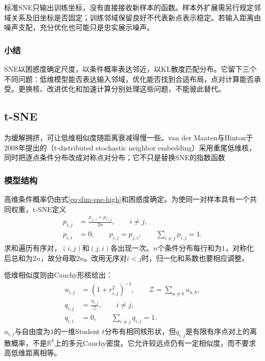 标准SNE只输出训练坐标，没有直接接收新样本的函数。样本外扩展需另行规定邻域关系及旧坐标是否固定；训练邻域保留良好不代表新点表示稳定。若输入距离由噪声支配，充分优化也可能只是忠实展示噪声。

\subsubsection{小结}

SNE以困惑度确定尺度，以条件概率表达邻近，以KL散度匹配分布。它留下三个不同问题：低维模型能否表达输入邻域，优化能否找到合适布局，点对计算能否承受。更换核、改进优化和加速计算分别处理这些问题，不能彼此替代。

\subsection{t-SNE}
\label{sec:dim-tsne}

为缓解拥挤，可让低维相似度随距离衰减得慢一些。van der Maaten与Hinton于2008年提出的（t-distributed stochastic neighbor embedding）采用重尾低维核，同时把逐点条件分布改成对称点对分布；它不只是替换SNE的指数函数

\subsubsection{模型结构}

高维条件概率仍由式\eqref{eq:dim-sne-high}和困惑度确定。为使同一对样本具有一个共同权重，t-SNE定义
\begin{equation}
  \label{eq:dim-tsne-joint}
  \begin{aligned}
    p_{i,j}&=\frac{p_{j\mid i}+p_{i\mid j}}{2n},\qquad i\ne j,\\
    p_{i,i}&=0,\qquad p_{i,j}=p_{j,i},\qquad
      \sum_{i\ne j}p_{i,j}=1.
  \end{aligned}
\end{equation}
求和遍历有序对，$(i,j)$和$(j,i)$各出现一次。$n$个条件分布每行和为$1$，对称化后总和为$2n$，故分母取$2n$。改用无序对$i<j$时，归一化和系数也要相应调整。

低维相似度则由Cauchy形核给出：
\begin{equation}
  \label{eq:dim-tsne-low}
  \begin{aligned}
    u_{i,j}&=(1+r_{i,j}^2)^{-1},\qquad
      \mathcal{Z}=\sum_{a\ne b}u_{a,b},\\
    q_{i,j}&=\frac{u_{i,j}}{\mathcal{Z}},\qquad i\ne j,\\
    q_{i,i}&=0,\qquad \sum_{i\ne j}q_{i,j}=1.
  \end{aligned}
\end{equation}
$u_{i,j}$与自由度为$1$的一维Student $t$分布有相同核形状，但$q_{i,j}$是有限有序点对上的离散概率，不是$\mathbb{R}^k$上的多元Cauchy密度。它允许较远点仍有一定相似度，而不要求高低维距离相等。

